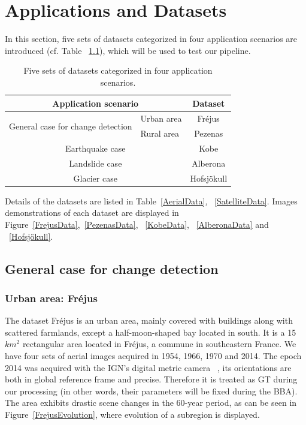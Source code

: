 
\chapter{Applications and Datasets}
\label{chap:ApplicationsAndDatasets}
In this section, five sets of datasets categorized in four application scenarios are introduced (cf. Table ~\ref{application}), which will be used to test our pipeline.

\begin{table}[htbp]
	\centering
	\begin{tabular}{||l|l||c||}\hline
		 \multicolumn{2}{||c||}{Application scenario} & Dataset \\\hline\hline
		 \multirow{2}{*}{General case for change detection} & Urban area & Fr{\'e}jus \\
		 & Rural area & Pezenas \\\hline
		 \multicolumn{2}{||c||}{Earthquake case} & Kobe \\\hline
		 \multicolumn{2}{||c||}{Landslide case} & Alberona \\\hline
		 \multicolumn{2}{||c||}{Glacier case} & Hofsjökull \\\hline
	\end{tabular}
	\caption{Five sets of datasets categorized in four application scenarios.}
	\label{application}
\end{table}

Details of the datasets are listed in Table~\ref{AerialData}, ~\ref{SatelliteData}. 
Images demonstrations of each dataset are displayed in Figure~\ref{FrejusData},~\ref{PezenasData}, ~\ref{KobeData}, ~\ref{AlberonaData} and ~\ref{Hofsjökull}.


\section{General case for change detection}
\subsection{Urban area: Fr{\'e}jus}
The dataset Fr{\'e}jus is an urban area, mainly covered with buildings along with scattered farmlands, except a half-moon-shaped bay located in south. It is a 15 $km^2$ rectangular area located in Fr{\'e}jus, a commune in southeastern France. We have four sets of aerial images acquired in 1954, 1966, 1970 and 2014. The epoch 2014 was acquired with the \ac{IGN}'s digital metric camera ~\cite{souchon2010ign}, its orientations are both in global reference frame and precise. Therefore it is treated as \ac{GT} during our processing (in other words, their parameters will be fixed during the \ac{BBA}). 
The area exhibits drastic scene changes in the 60-year period, as can be seen in Figure~\ref{FrejusEvolution}, where evolution of a subregion is displayed.\\

